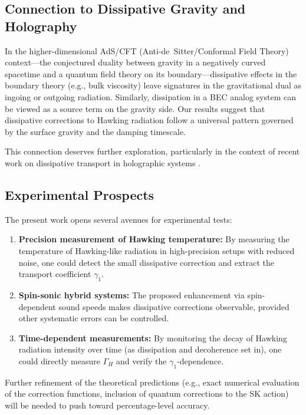 \documentclass[aps,prl,twocolumn,superscriptaddress,nofootinbib,amsmath,amssymb]{revtex4-2}
\begin{document}
\subsection{Connection to Dissipative Gravity and Holography}

In the higher-dimensional AdS/CFT (Anti-de~Sitter/Conformal Field Theory) context---the conjectured duality between gravity in a negatively curved spacetime and a quantum field theory on its boundary---dissipative effects in the boundary theory (e.g., bulk viscosity) leave signatures in the gravitational dual as ingoing or outgoing radiation. Similarly, dissipation in a BEC analog system can be viewed as a source term on the gravity side. Our results suggest that dissipative corrections to Hawking radiation follow a universal pattern governed by the surface gravity and the damping timescale.

This connection deserves further exploration, particularly in the context of recent work on dissipative transport in holographic systems \cite{Jana:2020}.

\subsection{Experimental Prospects}

The present work opens several avenues for experimental tests:
\begin{enumerate}
\item \textbf{Precision measurement of Hawking temperature:} By measuring the temperature of Hawking-like radiation in high-precision setups with reduced noise, one could detect the small dissipative correction and extract the transport coefficient $\gamma_1$.
\item \textbf{Spin-sonic hybrid systems:} The proposed enhancement via spin-dependent sound speeds makes dissipative corrections observable, provided other systematic errors can be controlled.
\item \textbf{Time-dependent measurements:} By monitoring the decay of Hawking radiation intensity over time (as dissipation and decoherence set in), one could directly measure $\Gamma_H$ and verify the $\gamma_1$-dependence.
\end{enumerate}

Further refinement of the theoretical predictions (e.g., exact numerical evaluation of the correction functions, inclusion of quantum corrections to the SK action) will be needed to push toward percentage-level accuracy.
\end{document}
